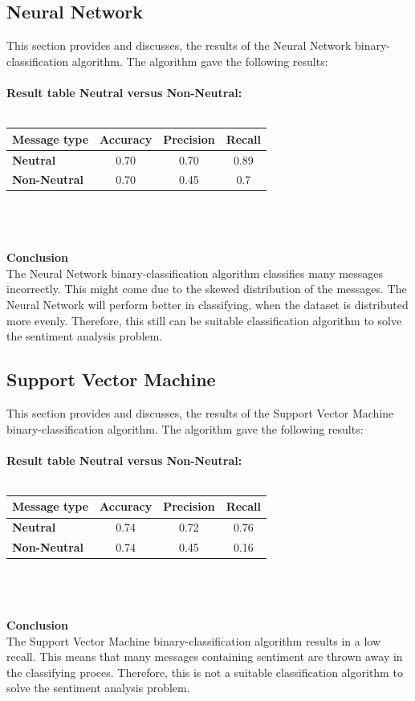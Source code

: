 \documentclass[11pt]{article}
\begin{document}
\subsection{Neural Network}
This section provides and discusses, the results of the Neural Network binary-classification algorithm. The algorithm gave the following results:\\\\
\textbf{Result table Neutral versus Non-Neutral:}\\\\
\begin{tabular}{| l || c | c | c |}
\hline
\textbf{Message type} & \textbf{Accuracy} & \textbf{Precision} & \textbf{Recall}\\
\hline \hline
\textbf{Neutral} & 0.70 & 0.70 & 0.89\\
\hline
\textbf{Non-Neutral} & 0.70 & 0.45 & 0.7\\
\hline
\end{tabular}\\\\\\
\textbf{Conclusion}\\
The Neural Network binary-classification algorithm classifies many messages incorrectly. This might come due to the skewed distribution of the messages. The Neural Network will perform better in classifying, when the dataset is distributed more evenly. Therefore, this still can be suitable classification algorithm to solve the sentiment analysis problem.

\subsection{Support Vector Machine}
This section provides and discusses, the results of the Support Vector Machine binary-classification algorithm. The algorithm gave the following results:\\\\
\textbf{Result table Neutral versus Non-Neutral:}\\\\
\begin{tabular}{| l || c | c | c |}
\hline
\textbf{Message type} & \textbf{Accuracy} & \textbf{Precision} & \textbf{Recall}\\
\hline \hline
\textbf{Neutral} & 0.74 & 0.72 & 0.76\\
\hline
\textbf{Non-Neutral} & 0.74 & 0.45 & 0.16\\
\hline
\end{tabular}\\\\\\
\textbf{Conclusion}\\
The Support Vector Machine binary-classification algorithm results in a low recall. This means that many messages containing sentiment are thrown away in the classifying proces. Therefore, this is not a suitable classification algorithm to solve the sentiment analysis problem.
\end{document}
